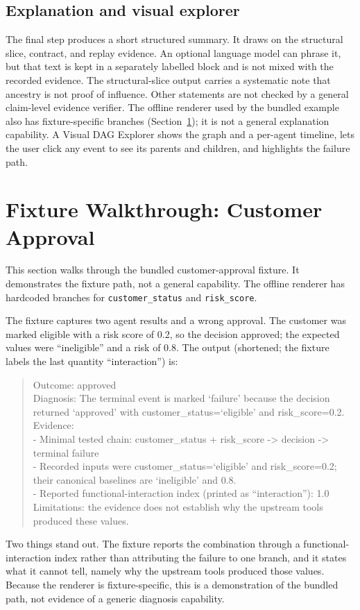 \documentclass[11pt]{article}
\newcommand{\code}[1]{\textcolor{codegreen}{\texttt{#1}}}
\begin{document}
\subsection{Explanation and visual explorer}
The final step produces a short structured summary. It draws on the structural slice, contract, and replay evidence. An optional language model can phrase it, but that text is kept in a separately labelled block and is not mixed with the recorded evidence. The structural-slice output carries a systematic note that ancestry is not proof of influence. Other statements are not checked by a general claim-level evidence verifier. The offline renderer used by the bundled example also has fixture-specific branches (Section~\ref{sec:example}); it is not a general explanation capability. A Visual DAG Explorer shows the graph and a per-agent timeline, lets the user click any event to see its parents and children, and highlights the failure path.

\section{Fixture Walkthrough: Customer Approval}\label{sec:example}
This section walks through the bundled customer-approval fixture. It demonstrates the fixture path, not a general capability. The offline renderer has hardcoded branches for \code{customer\_status} and \code{risk\_score}.

The fixture captures two agent results and a wrong approval. The customer was marked eligible with a risk score of 0.2, so the decision approved; the expected values were ``ineligible'' and a risk of 0.8. The output (shortened; the fixture labels the last quantity ``interaction'') is:
\begin{quote}\small
Outcome: approved\\
Diagnosis: The terminal event is marked `failure' because the decision returned `approved' with customer\_status=`eligible' and risk\_score=0.2.\\
Evidence:\\
- Minimal tested chain: customer\_status + risk\_score -> decision -> terminal failure\\
- Recorded inputs were customer\_status=`eligible' and risk\_score=0.2; their canonical baselines are `ineligible' and 0.8.\\
- Reported functional-interaction index (printed as ``interaction''): 1.0\\
Limitations: the evidence does not establish why the upstream tools produced these values.
\end{quote}
Two things stand out. The fixture reports the combination through a functional-interaction index rather than attributing the failure to one branch, and it states what it cannot tell, namely why the upstream tools produced those values. Because the renderer is fixture-specific, this is a demonstration of the bundled path, not evidence of a generic diagnosis capability.
\end{document}
